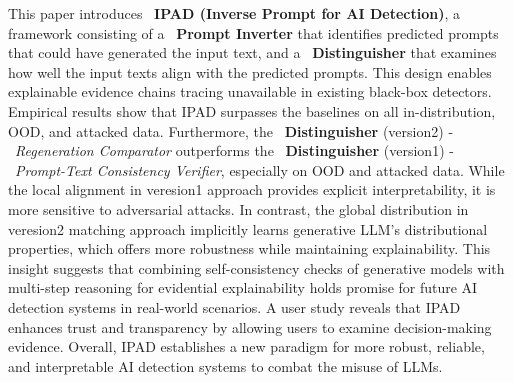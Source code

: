 This paper introduces ~\textbf{IPAD (Inverse Prompt for AI Detection)}, a framework consisting of a ~\textbf{Prompt Inverter} that identifies predicted prompts that could have generated the input text, and a ~\textbf{Distinguisher} that examines how well the input texts align with the predicted prompts. This design enables explainable evidence chains tracing unavailable in existing black-box detectors. Empirical results show that IPAD surpasses the baselines on all in-distribution, OOD, and attacked data. Furthermore, the ~\textbf{Distinguisher} (version2) - ~\textit{Regeneration Comparator} outperforms the ~\textbf{Distinguisher} (version1) - ~\textit{Prompt-Text Consistency Verifier}, especially on OOD and attacked data. While the local alignment in veresion1 approach provides explicit interpretability, it is more sensitive to adversarial attacks. In contrast, the global distribution in veresion2 matching approach implicitly learns generative LLM's distributional properties, which offers more robustness while maintaining explainability. This insight suggests that combining self-consistency checks of generative models with multi-step reasoning for evidential explainability holds promise for future AI detection systems in real-world scenarios. A user study reveals that IPAD enhances trust and transparency by allowing users to examine decision-making evidence. Overall, IPAD establishes a new paradigm for more robust, reliable, and interpretable AI detection systems to combat the misuse of LLMs.